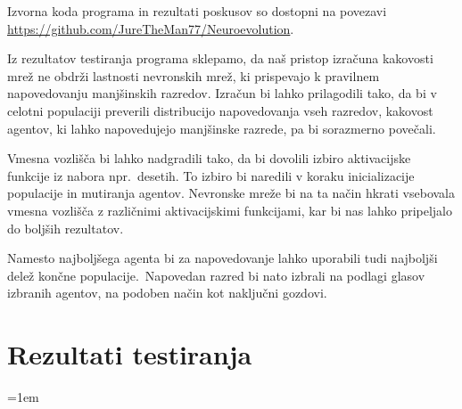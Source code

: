 \documentclass[a4paper,12pt,openright]{book}
\begin{document}
    Izvorna koda programa in rezultati poskusov so dostopni na povezavi \url{https://github.com/JureTheMan77/Neuroevolution}.

    Iz rezultatov testiranja programa sklepamo, da naš pristop izračuna kakovosti mrež ne obdrži lastnosti
    nevronskih mrež, ki prispevajo k pravilnem napovedovanju manjšinskih razredov.
    Izračun bi lahko prilagodili tako, da bi v celotni populaciji preverili distribucijo napovedovanja vseh razredov,
    kakovost agentov, ki lahko napovedujejo manjšinske razrede, pa bi sorazmerno povečali.

    Vmesna vozlišča bi lahko nadgradili tako, da bi dovolili izbiro aktivacijske funkcije iz nabora npr.\ desetih.
    To izbiro bi naredili v koraku inicializacije populacije in mutiranja agentov.
    Nevronske mreže bi na ta način hkrati vsebovala vmesna vozlišča z različnimi aktivacijskimi funkcijami, kar bi nas
    lahko pripeljalo do boljših rezultatov.

    Namesto najboljšega agenta bi za napovedovanje lahko uporabili tudi najboljši delež
    končne populacije.\ Napovedan razred bi nato izbrali na podlagi glasov izbranih agentov, na podoben način kot naključni gozdovi.

    \appendix
    \chapter{Rezultati testiranja}\label{ch:rezultati-testiranja}
    





    \emergencystretch=1em
    \printbibliography[heading=bibintoc,title={Literatura}]
\end{document}
